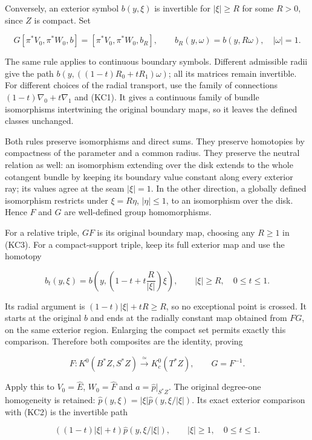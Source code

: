\documentclass[
  11pt,
]{article}
\begin{document}
Conversely, an exterior symbol \(b(y,\xi)\) is invertible for
\(|\xi|\geq R\) for some \(R>0\), since \(Z\) is compact. Set

\[
 G[\pi^*V_0,\pi^*W_0,b]
       =[\pi^*V_0,\pi^*W_0,b_R],\qquad
 b_R(y,\omega)=b(y,R\omega),\quad |\omega|=1.
 \tag{KC3}
\]

The same rule applies to continuous boundary symbols. Different
admissible radii give the path \(b(y,((1-t)R_0+tR_1)\omega)\); all its
matrices remain invertible. For different choices of the radial
transport, use the family of connections \((1-t)\nabla_0+t\nabla_1\) and
(KC1). It gives a continuous family of bundle isomorphisms intertwining
the original boundary maps, so it leaves the defined classes unchanged.

Both rules preserve isomorphisms and direct sums. They preserve
homotopies by compactness of the parameter and a common radius. They
preserve the neutral relation as well: an isomorphism extending over the
disk extends to the whole cotangent bundle by keeping its boundary value
constant along every exterior ray; its values agree at the seam
\(|\xi|=1\). In the other direction, a globally defined isomorphism
restricts under \(\xi=R\eta\), \(|\eta|\leq1\), to an isomorphism over
the disk. Hence \(F\) and \(G\) are well-defined group homomorphisms.

For a relative triple, \(GF\) is its original boundary map, choosing any
\(R\geq1\) in (KC3). For a compact-support triple, keep its full
exterior map and use the homotopy

\[
 b_t(y,\xi)=b\left(y,
           \left(1-t+t\frac R{|\xi|}\right)\xi\right),
 \qquad |\xi|\geq R,\quad 0\leq t\leq1.
 \tag{KC4}
\]

Its radial argument is \((1-t)|\xi|+tR\geq R\), so no exceptional point
is crossed. It starts at the original \(b\) and ends at the radially
constant map obtained from \(FG\), on the same exterior region.
Enlarging the compact set permits exactly this comparison. Therefore
both composites are the identity, proving

\[
 F:K^0(B^*Z,S^*Z)\xrightarrow{\ \simeq\ }K_c^0(T^*Z),
 \qquad G=F^{-1}.
 \tag{KC5}
\]

Apply this to \(V_0=\widehat E\), \(W_0=\widehat F\) and
\(a=\widehat p|_{S^*Z}\). The original degree-one homogeneity is
retained: \(\widehat p(y,\xi)=|\xi|\widehat p(y,\xi/|\xi|)\). Its exact
exterior comparison with (KC2) is the invertible path

\[
 \left((1-t)|\xi|+t\right)\widehat p(y,\xi/|\xi|),
             \qquad |\xi|\geq1,\quad0\leq t\leq1.
 \tag{KC6}
\]
\end{document}
